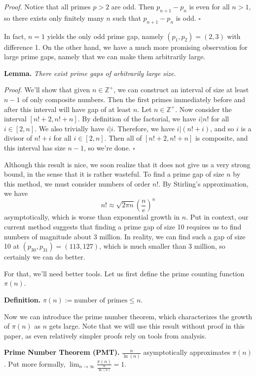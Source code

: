 \documentclass[12pt, letterpaper]{article}
\begin{document}
\noindent
\textit{Proof.} Notice that all primes $p > 2$ are odd. Then
$p_{n+1} - p_n$ is even for all $n > 1$, so there exists
only finitely many $n$ such that $p_{n+1} - p_n$ is odd.
\hfill$\square$

In fact, $n = 1$ yields the only odd prime gap, namely
$(p_1, p_2) = (2, 3)$ with difference 1. On the other
hand, we have a much more promising observation for large
prime gaps, namely that we can make them arbitrarily large.

\noindent
\textbf{Lemma.} \textit{There exist prime gaps of arbitrarily
large size.}

\noindent
\textit{Proof.} We'll show that given $n \in \mathbb{Z}^+$, we
can construct an interval of size at least $n - 1$ of only
composite numbers. Then the first primes immediately before
and after this interval will have gap of at least $n$.
\newline\indent
Let $n \in \mathbb{Z}^+$. Now consider the interval
$[n! + 2, n! + n]$. By definition of the
factorial, we have $i|n!$ for all $i \in [2, n]$. We also
trivially have $i|i$. Therefore, we have $i|(n! + i)$, and
so $i$ is a divisor of $n! + i$ for all $i \in [2, n]$.
Then all of $[n! + 2, n! + n]$ is composite, and this
interval has size $n - 1$, so we're done. \hfill$\square$

Although this result is nice, we soon realize that it does
not give us a very strong bound, in the sense that it is
rather wasteful. To find a prime gap of
size $n$ by this method, we must consider numbers of order
$n!$. By Stirling's approximation, we have
\[n! \approx \sqrt{2\pi n} \left(\frac{n}{e}\right)^n\]
asymptotically, which is worse than exponential growth in $n$.
Put in context, our current method suggests that finding
a prime gap of size 10 requires us to find numbers
of magnitude about 3 million. In reality, we can find such a
gap of size 10 at $(p_{30}, p_{31}) = (113, 127)$, which is
much smaller than 3 million, so certainly we can
do better.

For that, we'll need better tools. Let us first define
the prime counting function $\pi(n)$.

\noindent
\textbf{Definition.} $\pi(n) := \text{number of primes} \le n.$

Now we can introduce the prime number theorem,
which characterizes the growth of $\pi(n)$ as $n$ gets large.
Note that we will use this result without proof in this paper,
as even relatively simpler proofs rely on tools from
analysis.

\noindent
\textbf{Prime Number Theorem (PMT).}
$\frac{n}{\ln(n)}$ asymptotically approximates $\pi(n)$.
Put more formally,
$\displaystyle \lim_{n \to \infty} \frac{\pi(n)}{\frac{n}{\ln(n)}} = 1$.
\end{document}
